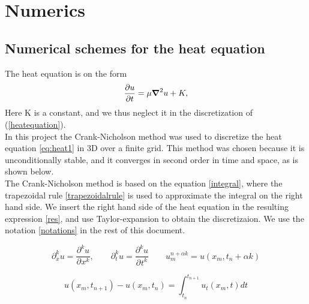 \chapter{Numerics}

\section{Numerical schemes for the heat equation}

The heat equation is on the form
\begin{equation}
\frac{\partial u}{\partial t}=\mu \mbox{\boldmath$ \nabla $} ^2 u + K,
\label{heatequation}
\end{equation}
Here K is a constant, and we thus neglect it in the discretization of (\ref{heatequation}).\\

In this project the Crank-Nicholson method was used to discretize the heat
equation \cref{eq:heat1} in 3D over a finite grid. This method was chosen because
it is unconditionally stable, and it converges in second order in time and
space, as is shown below. \\

The Crank-Nicholson method is based on the equation \cref{integral}, where the trapezoidal rule \cref{trapezoidalrule} is used to approximate the integral on the right hand side. We insert the right hand side of the heat equation in the resulting expression \cref{res}, and use Taylor-expansion to obtain the discretizaion. We use the notation \cref{notations} in the rest of this document.

\begin{equation}
\partial_{x}^{k}u=\frac{\partial^{k}u}{\partial^{}x^{k}},\quad \quad \partial_{t}^{k}u=\frac{\partial^{k}u}{\partial^{}t^{k}} \quad \quad u_{m}^{n+\alpha k } = u(x_{m},t_{n}+\alpha k)
\label{notations}
\end{equation}

\begin{equation}
u(x_m,t_{n+1}) - u(x_m,t_n) = \int_{t_n} ^{t_{n+1}} u_t(x_m,t) dt
\label{integral}
\end{equation}

